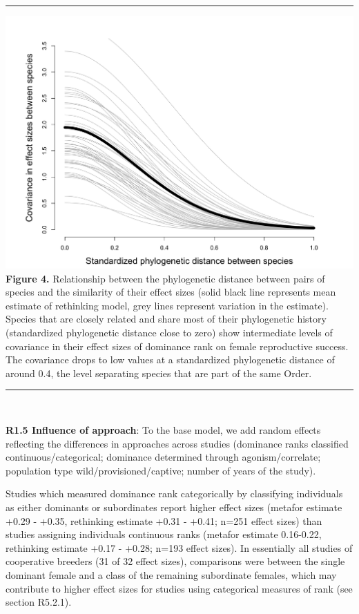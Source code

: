 \documentclass[
]{article}
\begin{document}
\begin{center}\rule{0.5\linewidth}{0.5pt}\end{center}

\includegraphics{ranksuccess_Fig4_covariation_phylogeny.png}
\textbf{Figure 4.} Relationship between the phylogenetic distance
between pairs of species and the similarity of their effect sizes (solid
black line represents mean estimate of rethinking model, grey lines
represent variation in the estimate). Species that are closely related
and share most of their phylogenetic history (standardized phylogenetic
distance close to zero) show intermediate levels of covariance in their
effect sizes of dominance rank on female reproductive success. The
covariance drops to low values at a standardized phylogenetic distance
of around 0.4, the level separating species that are part of the same
Order.

\begin{center}\rule{0.5\linewidth}{0.5pt}\end{center}

~

\textbf{R1.5 Influence of approach}: To the base model, we add random
effects reflecting the differences in approaches across studies
(dominance ranks classified continuous/categorical; dominance determined
through agonism/correlate; population type wild/provisioned/captive;
number of years of the study).

Studies which measured dominance rank categorically by classifying
individuals as either dominants or subordinates report higher effect
sizes (metafor estimate +0.29 - +0.35, rethinking estimate +0.31 -
+0.41; n=251 effect sizes) than studies assigning individuals continuous
ranks (metafor estimate 0.16-0.22, rethinking estimate +0.17 - +0.28;
n=193 effect sizes). In essentially all studies of cooperative breeders
(31 of 32 effect sizes), comparisons were between the single dominant
female and a class of the remaining subordinate females, which may
contribute to higher effect sizes for studies using categorical measures
of rank (see section R5.2.1).
\end{document}
